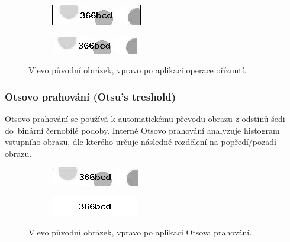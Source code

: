 \documentclass[
  field=ainfp,
  master=true,
  biblatex,
  sourcecodes=false,
  theorems=false,
  glossaries,
  index
]{kidiplom}
\begin{document}
\begin{figure}[H]
\centering
\begin{subfigure}{.5\textwidth}
  \centering
  \includegraphics[width=.8\linewidth]{images/crop_original.png}
\end{subfigure}%
\begin{subfigure}{.5\textwidth}
  \centering
  \includegraphics[width=.8\linewidth]{images/crop_result.png}
\end{subfigure}
\caption{Vlevo původní obrázek, vpravo po aplikaci operace oříznutí.}
\label{fig:crop_example}
\end{figure}

\subsubsection*{Otsovo prahování (Otsu's treshold)}
Otsovo prahování se používá k automatickému převodu obrazu z odstínů šedi do~binární černobílé podoby. Interně Otsovo prahování analyzuje histogram vstupního obrazu, dle kterého určuje následné rozdělení na popředí/pozadí obrazu. 


\begin{figure}[H]
\centering
\begin{subfigure}{.5\textwidth}
  \centering
  \includegraphics[width=.8\linewidth]{images/otsu_original.png}
\end{subfigure}%
\begin{subfigure}{.5\textwidth}
  \centering
  \includegraphics[width=.8\linewidth]{images/otsu_result.png}
\end{subfigure}
\caption{Vlevo původní obrázek, vpravo po aplikaci Otsova prahování.}
\label{fig:inverse_example}
\end{figure}
\end{document}
